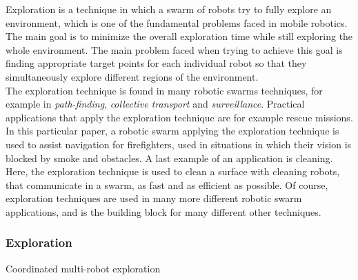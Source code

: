 
Exploration is a technique in which a swarm of robots try to fully explore an environment, which is one of the fundamental problems faced in mobile robotics. 
The main goal is to minimize the overall exploration time while still exploring the whole environment. 
The main problem faced when trying to achieve this goal is finding appropriate target points for each individual robot so that they simultaneously explore different regions of the environment. \cite{burgard2005coordinated} \\
The exploration technique is found in many robotic swarms techniques, for example in \emph{path-finding}, \emph{collective transport} and \emph{surveillance}.
Practical applications that apply the exploration technique are for example rescue missions. \cite{Naghsh2008,Penders2011}
In this particular paper, a robotic swarm applying the exploration technique is used to assist navigation for firefighters, used in situations in which their vision is blocked by smoke and obstacles. 
A last example of an application is cleaning. \cite{wagner2008cooperative}
Here, the exploration technique is used to clean a surface with cleaning robots, that communicate in a swarm, as fast and as efficient as possible. 
Of course, exploration techniques are used in many more different robotic swarm applications, and is the building block for many different other techniques. 



\subsubsection{Exploration}

Coordinated multi-robot exploration
\cite{burgard2005coordinated}

